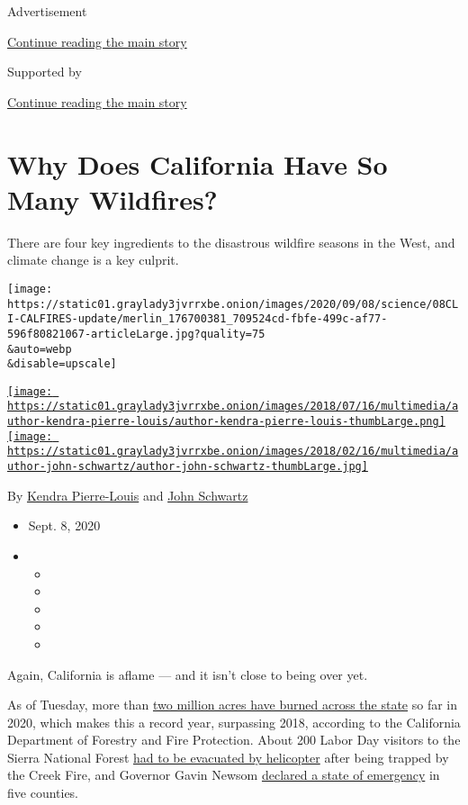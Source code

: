 Advertisement

\protect\hyperlink{after-top}{Continue reading the main story}

Supported by

\protect\hyperlink{after-sponsor}{Continue reading the main story}

\hypertarget{why-does-california-have-so-many-wildfires}{%
\section{Why Does California Have So Many
Wildfires?}\label{why-does-california-have-so-many-wildfires}}

There are four key ingredients to the disastrous wildfire seasons in the
West, and climate change is a key culprit.

\texttt{[image: https://static01.graylady3jvrrxbe.onion/images/2020/09/08/science/08CLI-CALFIRES-update/merlin\_176700381\_709524cd-fbfe-499c-af77-596f80821067-articleLarge.jpg?quality=75\\\&auto=webp\\\&disable=upscale]}

\href{https://www.nytimes3xbfgragh.onion/by/kendra-pierre-louis}{\texttt{[image: https://static01.graylady3jvrrxbe.onion/images/2018/07/16/multimedia/author-kendra-pierre-louis/author-kendra-pierre-louis-thumbLarge.png]}}\href{https://www.nytimes3xbfgragh.onion/by/john-schwartz}{\texttt{[image: https://static01.graylady3jvrrxbe.onion/images/2018/02/16/multimedia/author-john-schwartz/author-john-schwartz-thumbLarge.jpg]}}

By
\href{https://www.nytimes3xbfgragh.onion/by/kendra-pierre-louis}{Kendra
Pierre-Louis} and
\href{https://www.nytimes3xbfgragh.onion/by/john-schwartz}{John
Schwartz}

\begin{itemize}
\item
  Sept. 8, 2020
\item
  \begin{itemize}
  \item
  \item
  \item
  \item
  \item
  \end{itemize}
\end{itemize}

Again, California is aflame --- and it isn't close to being over yet.

As of Tuesday, more than
\href{https://www.fire.ca.gov/daily-wildfire-report/}{two million acres
have burned across the state} so far in 2020, which makes this a record
year, surpassing 2018, according to the California Department of
Forestry and Fire Protection. About 200 Labor Day visitors to the Sierra
National Forest
\href{https://www.nytimes3xbfgragh.onion/2020/09/06/us/mammoth-pools-fires-california.html}{had
to be evacuated by helicopter} after being trapped by the Creek Fire,
and Governor Gavin Newsom
\href{https://www.gov.ca.gov/wp-content/uploads/2020/09/9.6.20-September-Fires-Emergency.pdf}{declared
a state of emergency} in five counties.

